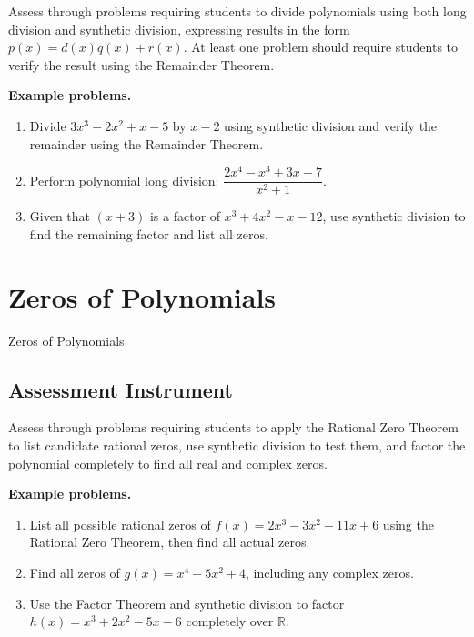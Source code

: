 Assess through problems requiring students to divide polynomials using both long division
and synthetic division, expressing results in the form $p(x) = d(x)q(x) + r(x)$. At least
one problem should require students to verify the result using the Remainder Theorem.

\textbf{Example problems.}

\begin{enumerate}
    \item Divide $3x^3 - 2x^2 + x - 5$ by $x - 2$ using synthetic division and verify the remainder using the Remainder Theorem.
    \item Perform polynomial long division: $\dfrac{2x^4 - x^3 + 3x - 7}{x^2 + 1}$.
    \item Given that $(x + 3)$ is a factor of $x^3 + 4x^2 - x - 12$, use synthetic division to find the remaining factor and list all zeros.
\end{enumerate}

\section{Zeros of Polynomials}
\label{sec:zero-ebde}

Zeros of Polynomials

\subsection{Assessment Instrument}
\label{ssec:asse-7f8e}

Assess through problems requiring students to apply the Rational Zero Theorem to list
candidate rational zeros, use synthetic division to test them, and factor the polynomial
completely to find all real and complex zeros.

\textbf{Example problems.}

\begin{enumerate}
    \item List all possible rational zeros of $f(x) = 2x^3 - 3x^2 - 11x + 6$ using the Rational Zero Theorem, then find all actual zeros.
    \item Find all zeros of $g(x) = x^4 - 5x^2 + 4$, including any complex zeros.
    \item Use the Factor Theorem and synthetic division to factor $h(x) = x^3 + 2x^2 - 5x - 6$ completely over $\mathbb{R}$.
\end{enumerate}

